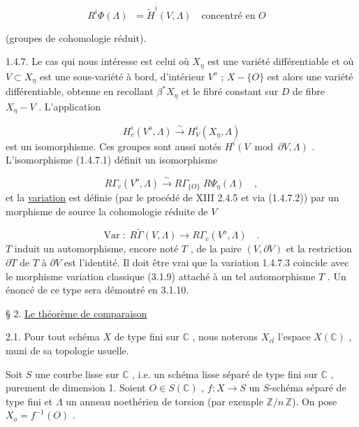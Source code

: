\begin{equation*}
R^i \Phi(\Lambda) \;\; = \widetilde{H}^i(V, \Lambda) \quad \text{concentré en } O \quad 
\end{equation*}


 (groupes de cohomologie réduit).

1.4.7. Le cas qui nous intéresse est celui où $X_\eta$ est une variété différentiable et où $V \subset X_\eta$ est une sous-variété à bord, d'intérieur $V^o$ ; $X-\{O\}$ est alors une variété différentiable, obtenue en recollant $\beta^* X_\eta$ et le fibré constant sur $D$ de fibre $X_\eta - V$ . L'application

\begin{equation}\tag{1.4.7.1}
H^i_c(V^o, \Lambda) \overset{\sim}{\longrightarrow} H^i_V(X_\eta , \Lambda)
\end{equation}
est un isomorphisme. Ces groupes sont aussi notés $H^i(V \bmod \partial V, \Lambda)$ . L'isomorphisme (1.4.7.1) définit un isomorphisme

\begin{equation}\tag{1.4.7.2}
R\Gamma_c(V^o, \Lambda ) \overset{\sim}{\longrightarrow} R\Gamma_{\{O\}} \; R\Psi_\eta(\Lambda ) \quad ,
\end{equation}
et la \underline{variation} est définie (par le procédé de XIII 2.4.5 et via (1.4.7.2)) par un morphisme de source la cohomologie réduite de $V$

\begin{equation}\tag{1.4.7.3}
\mathrm{Var} \; : \; R\widetilde{\Gamma}(V, \Lambda) \longrightarrow R\Gamma_c(V^o, \Lambda) \quad .
\end{equation}
$T$ induit un automorphisme, encore noté $T$ , de la paire $(V, \partial V)$ et la restriction $\partial T$ de $T$ à $\partial V$ est l'identité. Il doit être vrai que la variation 1.4.7.3 coincide avec le morphisme variation classique (3.1.9) attaché à un tel automorphisme $T$ . Un énoncé de ce type sera démontré en 3.1.10.


§ 2. \underline{Le théorème de comparaison}

2.1. Pour tout schéma $X$ de type fini sur $\mathbb{C}$ , nous noterons $X_{cl}$ l'espace $X(\mathbb{C})$ , muni de sa topologie usuelle.

Soit $S$ une courbe lisse sur $\mathbb{C}$ , i.e. un schéma lisse séparé de type fini sur $\mathbb{C}$ , purement de dimension 1. Soient $O \in S(\mathbb{C})$ , $f : X \longrightarrow S$ un $S$-schéma séparé de type fini et $\Lambda$ un anneau noethérien de torsion (par exemple $\mathbb{Z}/n\,\mathbb{Z}$). On pose $X_o = f^{-1}(O)$ .


